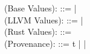 \begin{plstx}
(Base Values): \valbase ::= \bytes | \vptr{\lloc}{\btag}\\
(LLVM Values): \vallvm ::= \valbase | \tpl{\overline{\vallvm}}\\
(Rust Values): \valrust ::= \valbase\\
(Provenance): \btag ::= t | \provwildcard | \cdot\\
\end{plstx}